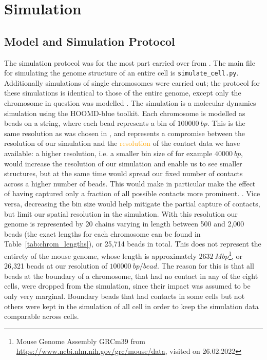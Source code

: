 \documentclass[a4paper,11pt,oneside,final,english,toc=bib,draft]{scrbook}
\begin{document}



\chapter{Simulation} %
\label{cha:simulation}

\section{Model and Simulation Protocol} %
\label{sec:model_and_simulation_protocol}

The simulation protocol was for the most part carried over from \cite{wettermann_minimal_2020}. The main file for simulating the genome structure of an entire cell is \verb|simulate_cell.py|. Additionally simulations of single chromosomes were carried out; the protocol for these simulations is identical to those of the entire genome, except only the chromosome in question was modelled . The simulation is a molecular dynamics simulation using the HOOMD-blue\cite{anderson_hoomd-blue_2020} toolkit. Each chromosome is modelled as beads on a string, where each bead represents a bin of \(\SI{100000}{bp}\). This is the same resolution as was chosen in \cite{wettermann_minimal_2020}, and represents a compromise between the resolution of our simulation and the \textcolor{orange}{resolution} of the contact data we have available: a higher resolution, i.e. a smaller bin size of for example \(\SI{40000}{bp}\), would increase the resolution of our simulation and enable us to see smaller structures, but at the same time would spread our fixed number of contacts across a higher number of beads. This would make in particular make the effect of having captured only a fraction of all possible contacts more prominent. . Vice versa, decreasing the bin size would help mitigate the partial capture of contacts, but limit our spatial resolution in the simulation. With this resolution our genome is represented by 20 chains varying in length between 500 and 2,000 beads (the exact lengths for each chromosome can be found in Table~\ref{tab:chrom_lengths}), or 25,714 beads in total. This does not represent the entirety of the mouse genome, whose length is approximately \(\SI{2632}{Mbp}\)\footnote{Mouse Genome Assembly GRCm39 from \url{https://www.ncbi.nlm.nih.gov/grc/mouse/data}, visited on 26.02.2022}, or 26,321 beads at our resolution of \(\SI{100000}{bp \per bead}\). The reason for this is that all beads at the boundary of a chromosome, that had no contact in any of the eight cells, were dropped from the simulation, since their impact was assumed to be only very marginal. Boundary beads that had contacts in some cells but not others were kept in the simulation of all cell in order to keep the simulation data comparable across cells.
\end{document}
